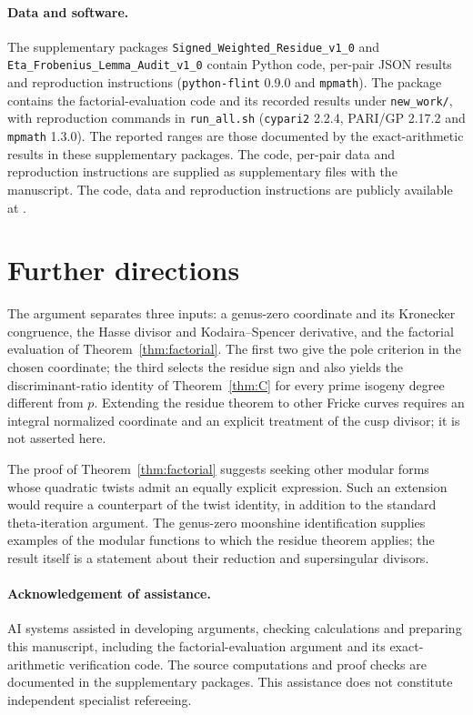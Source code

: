 \documentclass[11pt,a4paper]{article}
\numberwithin{equation}{section}
\theoremstyle{definition}
\theoremstyle{remark}
\newcommand{\DataRepositoryURL}{}
\begin{document}
\paragraph{Data and software.}
The supplementary packages \texttt{Signed\_Weighted\_Residue\_v1\_0} and
\texttt{Eta\_Frobenius\_Lemma\_Audit\_v1\_0} contain Python code, per-pair JSON
results and reproduction instructions (\texttt{python-flint} 0.9.0 and
\texttt{mpmath}). The package 
contains the factorial-evaluation code and its recorded results under
\texttt{new\_work/}, with reproduction commands in \texttt{run\_all.sh}
(\texttt{cypari2} 2.2.4, PARI/GP 2.17.2 and \texttt{mpmath} 1.3.0).
The reported ranges are those documented by the exact-arithmetic results
in these supplementary packages.
\if\relax\detokenize\expandafter{\DataRepositoryURL}\relax
The code, per-pair data and reproduction instructions are supplied as
supplementary files with the manuscript.
\else
The code, data and reproduction instructions are publicly available at
\expandafter\url\expandafter{\DataRepositoryURL}.
\fi

\section{Further directions}
The argument separates three inputs: a genus-zero coordinate and its
Kronecker congruence, the Hasse divisor and Kodaira--Spencer derivative,
and the factorial evaluation of Theorem~\ref{thm:factorial}.
The first two give the pole criterion in the chosen coordinate; the
third selects the residue sign and also yields the discriminant-ratio
identity of Theorem~\ref{thm:C} for every prime isogeny degree different
from $p$. Extending the residue theorem to other Fricke curves requires
an integral normalized coordinate and an explicit treatment of the cusp
divisor; it is not asserted here.

The proof of Theorem~\ref{thm:factorial} suggests seeking other modular
forms whose quadratic twists admit an equally explicit expression.
Such an extension would require a counterpart of the twist identity,
in addition to the standard theta-iteration argument. The genus-zero
moonshine identification supplies examples of the modular functions
to which the residue theorem applies; the result itself is a statement
about their reduction and supersingular divisors.

\paragraph{Acknowledgement of assistance.}
AI systems assisted in developing arguments, checking calculations and
preparing this manuscript, including the factorial-evaluation argument
and its exact-arithmetic verification code. The source computations
and proof checks are documented in the supplementary packages.
This assistance does not constitute independent specialist refereeing.
\end{document}
